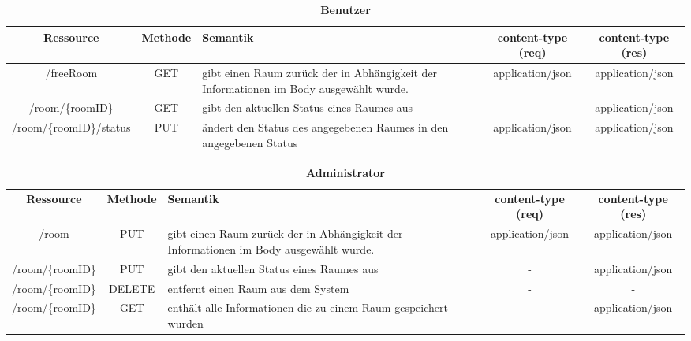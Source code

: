 
\begin{table}[h]
	\caption{\textbf{Benutzer}}
 	\begin{tabularx}{\textwidth}{|c|c|X|c|c|}
		\rowcolor{heading}\textbf{Ressource} & \textbf{Methode} & \textbf{Semantik} & \textbf{content-type (req)} & \textbf{content-type (res)}\\ \hline
		/freeRoom & GET & gibt einen Raum zurück der in Abhängigkeit der Informationen im Body ausgewählt wurde. & application/json & application/json\\
		\rowcolor{odd}	/room/\{roomID\} & GET & gibt den aktuellen Status eines Raumes aus & - & application/json\\
		/room/\{roomID\}/status & PUT & ändert den Status des angegebenen Raumes in den angegebenen Status & application/json & application/json\\
 	\end{tabularx}
 \end{table}
 
 \begin{table}[h]
	\caption{\textbf{Administrator}}
 	\begin{tabularx}{\textwidth}{|c|c|X|c|c|}
		\rowcolor{heading}\textbf{Ressource} & \textbf{Methode} & \textbf{Semantik} & \textbf{content-type (req)} & \textbf{content-type (res)}\\
						/room & PUT & gibt einen Raum zurück der in Abhängigkeit der Informationen im Body ausgewählt wurde. & application/json & application/json\\
		\rowcolor{odd}	/room/\{roomID\} & PUT & gibt den aktuellen Status eines Raumes aus & - & application/json\\
						/room/\{roomID\} & DELETE & entfernt einen Raum aus dem System & - & -\\
		\rowcolor{odd}	/room/\{roomID\} & GET & enthält alle Informationen die zu einem Raum gespeichert wurden & - & application/json\\
 	\end{tabularx}
 \end{table}